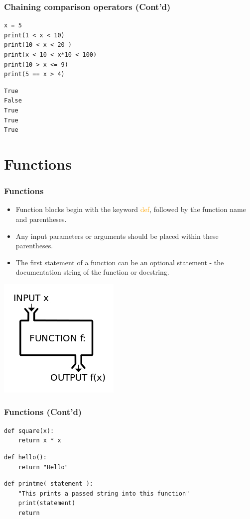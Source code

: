 \documentclass{../py-lecture}
\begin{document}
\begin{frame}[fragile]
  \frametitle{Chaining comparison operators (Cont'd)}
  \begin{verbatim}
x = 5
print(1 < x < 10)
print(10 < x < 20 )
print(x < 10 < x*10 < 100)
print(10 > x <= 9)
print(5 == x > 4)
  \end{verbatim}
  \begin{verbatim}
True
False
True
True
True
  \end{verbatim}
\end{frame}

\section{Functions}

\begin{frame}
	\frametitle{Functions}
  \begin{itemize}
    \item Function blocks begin with the keyword \textcolor{Orange}{def},
    followed by the function name and parentheses.
    \item Any input parameters or arguments should be placed
    within these parentheses.
    \item The first statement of a function can be an optional statement -
    the documentation string of the function or docstring.
  \end{itemize}
	\centering \includegraphics[width=.4\textwidth]{img/functions.jpg}
\end{frame}

\begin{frame}[fragile]
	\frametitle{Functions (Cont'd)}
  \begin{verbatim}
def square(x):
    return x * x
  \end{verbatim}
  \begin{verbatim}
def hello():
    return "Hello"
  \end{verbatim}
  \begin{verbatim}
def printme( statement ):
    "This prints a passed string into this function"
    print(statement)
    return
  \end{verbatim}
\end{frame}
\end{document}
